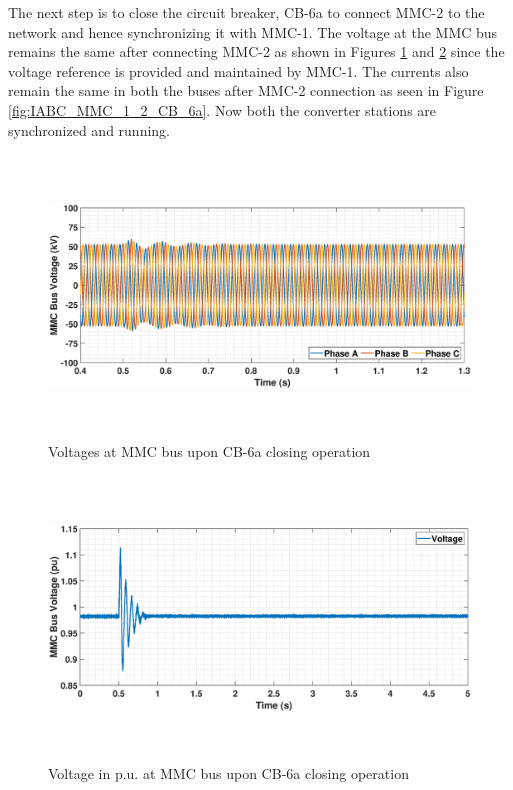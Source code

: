 The next step is to close the circuit breaker, CB-6a to connect \gls{MMC}-2 to the network and hence synchronizing it with \gls{MMC}-1. The voltage at the \gls{MMC} bus remains the same after connecting \gls{MMC}-2 as shown in Figures \ref{fig:VABC_MMC_1_2_CB_6a} and \ref{fig:VACP_MMC_1_2_CB_6a} since the voltage reference is provided and maintained by \gls{MMC}-1. The currents also remain the same in both the buses after \gls{MMC}-2 connection as seen in Figure \ref{fig:IABC_MMC_1_2_CB_6a}. Now both the converter stations are synchronized and running.


\begin{figure}[H]
    \includegraphics[height = 7.5cm,width = \textwidth]{Diagrams/Chapter_5/VABC_MMC_1_2_CB_6a.eps}
    \caption{Voltages at MMC bus upon CB-6a closing operation}
    \label{fig:VABC_MMC_1_2_CB_6a}
\end{figure}

\begin{figure}[H]
    \includegraphics[height = 7.5cm,width = \textwidth]{Diagrams/Chapter_5/VACP_MMC_1_2_CB_6a.eps}
    \caption{Voltage in p.u. at MMC bus upon CB-6a closing operation}
    \label{fig:VACP_MMC_1_2_CB_6a}
\end{figure}

